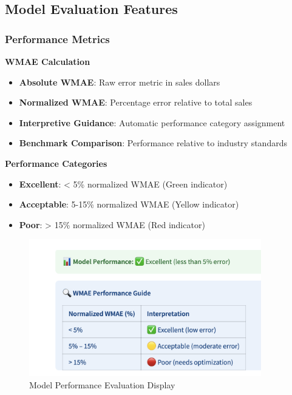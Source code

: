 \subsection{Model Evaluation Features}

\subsubsection{Performance Metrics}

\textbf{WMAE Calculation}
\begin{itemize}
	\item \textbf{Absolute WMAE}: Raw error metric in sales dollars
	\item \textbf{Normalized WMAE}: Percentage error relative to total sales
	\item \textbf{Interpretive Guidance}: Automatic performance category assignment
	\item \textbf{Benchmark Comparison}: Performance relative to industry standards
\end{itemize}

\textbf{Performance Categories}
\begin{itemize}
	\item \textbf{Excellent}: < 5\% normalized WMAE (Green indicator)
	\item \textbf{Acceptable}: 5-15\% normalized WMAE (Yellow indicator)
	\item \textbf{Poor}: > 15\% normalized WMAE (Red indicator)
\end{itemize}

\begin{figure}[H]
	\centering
	\includegraphics[width=0.9\textwidth]{Images/05ApplicationFunctionsAndFeatures/PerformanceMetrics.png}
	\caption{Model Performance Evaluation Display}
	\label{fig:performance_metrics}
\end{figure}


